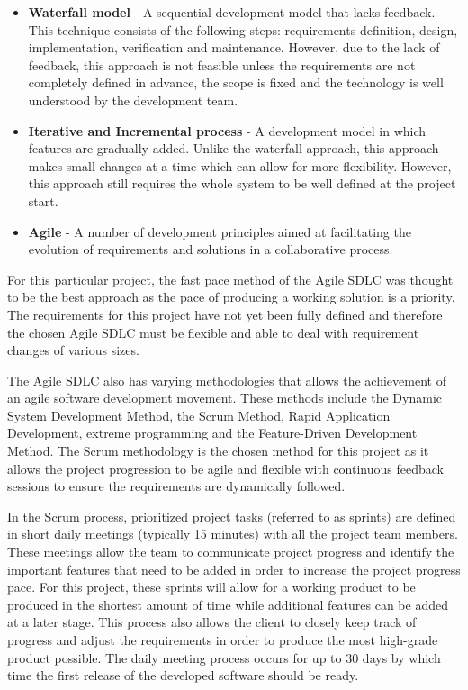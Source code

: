 \documentclass[12pt,onecolumn]{article}
\begin{document}
	\begin{itemize}
		\item \textbf{Waterfall model} - A sequential development model that lacks feedback. This technique consists of the following steps: requirements definition, design, implementation, verification and maintenance. However, due to the lack of feedback, this approach is not feasible unless the requirements are not completely defined in advance, the scope is fixed and the technology is well understood by the development team.
		
		\item \textbf{Iterative and Incremental process} - A development model in which features are gradually added. Unlike the waterfall approach, this approach makes small changes at a time which can allow for more flexibility. However, this approach still requires the whole system to be well defined at the project start.
		
		\item \textbf{Agile} - A number of development principles aimed at facilitating the evolution of requirements and solutions in a collaborative process.
		
	\end{itemize}
	
	For this particular project, the fast pace method of the Agile SDLC was thought to be the best approach as the pace of producing a working solution is a priority. The requirements for this project have not yet been fully defined and therefore the chosen Agile SDLC must be flexible and able to deal with requirement changes of various sizes.
	
	The Agile SDLC also has varying methodologies that allows the achievement of an agile software development movement. These methods include the Dynamic System Development Method, the Scrum Method, Rapid Application Development, extreme programming and the Feature-Driven Development Method. The Scrum methodology is the chosen method for this project as it allows the project progression to be agile and flexible with continuous feedback sessions to ensure the requirements are dynamically followed\cite{Kinsey}.
	
	In the Scrum process, prioritized project tasks (referred to as sprints) are defined in short daily meetings (typically 15 minutes) with all the project team members. These meetings allow the team to communicate project progress and identify the important features that need to be added in order to increase the project progress pace. For this project, these sprints will allow for a working product to be produced in the shortest amount of time while additional features can be  added at a later stage. This process also allows the client to closely keep track of progress and adjust the requirements in order to produce the most high-grade product possible. The daily meeting process occurs for up to 30 days by which time the first release of the developed software should be ready.   
	
\end{document}
